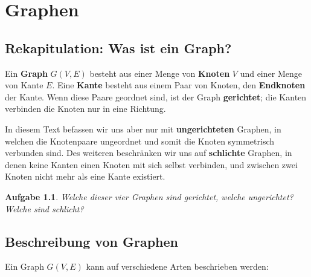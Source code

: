 \documentclass[12pt,a4paper]{report}
\theoremstyle{break}
\newtheorem{exercise}{Aufgabe}[section]
\theoremstyle{plain}
\begin{document}
\chapter{Graphen}
\label{graphs}

\section{Rekapitulation: Was ist ein Graph?}

Ein \textbf{Graph} $G(V,E)$ besteht aus einer Menge von
\textbf{Knoten} $V$ und einer Menge von Kante $E$. Eine \textbf{Kante}
besteht aus einem Paar von Knoten, den \textbf{Endknoten} der
Kante. Wenn diese Paare geordnet sind, ist der Graph
\textbf{gerichtet}; die Kanten verbinden die Knoten nur in eine
Richtung. 

In diesem Text befassen wir uns aber nur mit
\textbf{ungerichteten} Graphen, in welchen die Knotenpaare ungeordnet
und somit die Knoten symmetrisch verbunden sind.  Des weiteren
beschr\"{a}nken wir uns auf \textbf{schlichte} Graphen, in denen keine
Kanten einen Knoten mit sich selbst verbinden, und zwischen zwei
Knoten nicht mehr als eine Kante existiert.

\begin{exercise}\label{exgerichtet}
Welche dieser vier Graphen sind gerichtet, welche ungerichtet? Welche
sind schlicht?

\end{exercise}

\section{Beschreibung von Graphen}
\label{Beschreibung}
\noindent Ein Graph $G(V,E)$ kann auf verschiedene Arten beschrieben werden:
\end{document}
